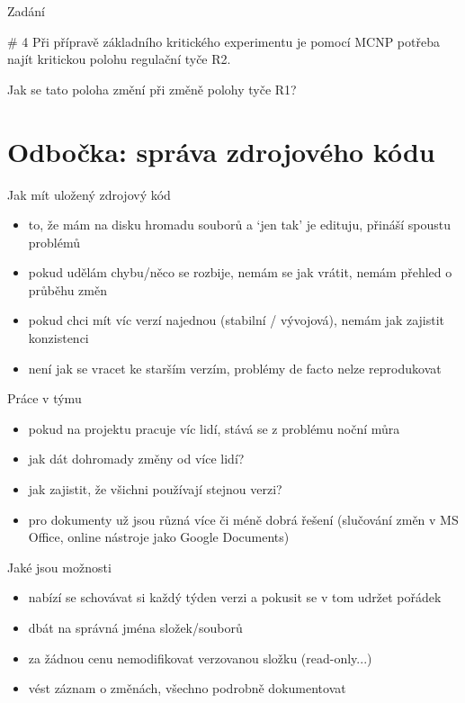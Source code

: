 \documentclass{beamer}
\begin{document}
\begin{frame}{Zadání}
  \begin{block}{\# 4}
    Při přípravě základního kritického experimentu je pomocí MCNP potřeba najít kritickou polohu regulační tyče R2.

    Jak se tato poloha změní při změně polohy tyče R1?
  \end{block}
\end{frame}


\section{Odbočka: správa zdrojového kódu}

\begin{frame}{Jak mít uložený zdrojový kód}
  \begin{itemize}
    \item to, že mám na disku hromadu souborů a `jen tak' je edituju, přináší spoustu problémů
    \item pokud udělám chybu/něco se rozbije, nemám se jak vrátit, nemám přehled o průběhu změn
    \item pokud chci mít víc verzí najednou (stabilní / vývojová), nemám jak zajistit konzistenci
    \item není jak se vracet ke starším verzím, problémy de facto nelze reprodukovat
  \end{itemize}
\end{frame}

\begin{frame}{Práce v týmu}
  \begin{itemize}
    \item pokud na projektu pracuje víc lidí, stává se z problému noční můra
    \item jak dát dohromady změny od více lidí?
    \item jak zajistit, že všichni používají stejnou verzi?
    \item pro dokumenty už jsou různá více či méně dobrá řešení (slučování změn v MS Office, online nástroje jako Google Documents)
  \end{itemize}
\end{frame}

\begin{frame}{Jaké jsou možnosti}
  \begin{itemize}
    \item nabízí se schovávat si každý týden verzi a pokusit se v tom udržet pořádek
    \item dbát na správná jména složek/souborů
    \item za žádnou cenu nemodifikovat verzovanou složku (read-only...)
    \item vést záznam o změnách, všechno podrobně dokumentovat
  \end{itemize}
\end{frame}
\end{document}
